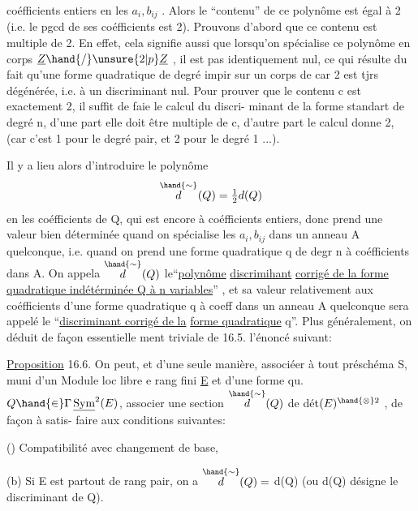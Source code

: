 
coéfficients entiers en les $a_i,b_{ij}$ . Alors le ``contenu'' de ce polynôme
est égal à 2 (i.e. le pgcd de ses coéfficients est 2).
 Prouvons d'abord que ce contenu est multiple de 2.
En effet, cela signifie aussi que  lorsqu'on spécialise ce polynôme
en  corps $\underline{Z}\hand{/}\unsure{2|p}\underline{Z}$\hand{)} , il est pas identiquement nul, ce qui 
résulte du fait qu'une forme quadratique de degré impir sur un corps de
car 2 est tjrs dégénérée, i.e. à un discriminant nul. Pour prouver
que le contenu c est exactement 2, il suffit de faie le calcul du discri-%
minant de la forme standart de degré n, d'une part elle doit être multiple de c,
d'autre part le calcul donne 2, (car c'est 1 pour le degré pair, et 2 pour
le degré 1 ...).

 Il y a lieu alors d'introduire le polynôme
\[ \overset{\hand{\sim}}{d}^{}(Q) = \tfrac{1}{2}d(Q) \]
en les coéfficients de Q, qui est encore à coéfficients entiers, donc
prend une valeur bien déterminée quand on spécialise les $a_i,b_{ij}$ dans un
anneau A quelconque, i.e. quand on prend une forme quadratique q de degr
n à coéfficients dans A. On appela $\overset{\hand{\sim}}{d}^{}(Q)$ le``\uline{polynôme} \uline{discrimihant}
\uline{corrigé de la forme quadratique indétérminée Q à n variables}'' , et sa
valeur relativement aux coéfficients d'une forme quadratique q à coeff
dans un anneau A quelconque sera appelé le ``\uline{discriminant corrigé de la}
\uline{forme quadratique} q''. Plus généralement, on déduit de façon essentielle
ment triviale de 16.5. l'énoncé suivant:

\uline{Proposition} 16.6. On peut, et d'une seule manière, associéer à tout
préschéma S, muni d'un Module loc libre e rang fini \uline{E} et d'une forme qu.
$Q \hand{\in}\Gamma\,\underline{\mathrm{Sym}}^2(E)$, associer une section $\overset{\hand{\sim}}{d}(Q)$ de dét$(E)^{\hand{\otimes}2}$ , de façon à satis-%
faire aux conditions suivantes:

() Compatibilité avec changement de base,

(b) Si E est partout de rang pair, on a $\overset{\hand{\sim}}{d}(Q) =$ d(Q) (ou d(Q)
désigne le discriminant de Q).

